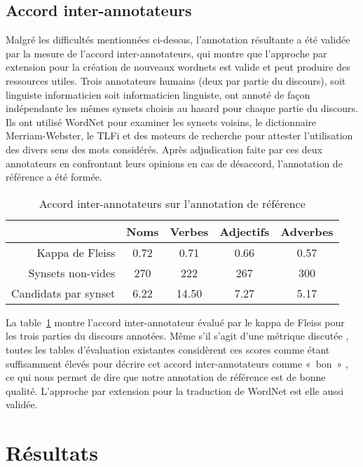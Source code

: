 \subsection{Accord inter-annotateurs}
\label{subsec:interannotator_agreement}

Malgré les difficultés mentionnées ci-dessus, l'annotation résultante a été
validée par la mesure de l'accord inter-annotateurs, qui montre que l'approche
par extension pour la création de nouveaux wordnets est valide et peut produire
des ressources utiles. Trois annotateurs humains (deux par partie du discours),
soit linguiste informaticien soit informaticien linguiste, ont annoté de façon
indépendante les mêmes synsets choisis au hasard pour chaque partie du
discours. Ils ont utilisé WordNet pour examiner les synsets voisins, le
dictionnaire Merriam-Webster, le TLFi \citep{TLFi} et des moteurs de recherche
pour attester l'utilisation des divers sens des mots considérés. Après
adjudication faite par ces deux annotateurs en confrontant leurs opinions en
cas de désaccord, l'annotation de référence a été formée.

\begin{table}[ht]
\centering
\begin{tabular}{rcccc}
  \toprule
                        & Noms    & Verbes  & Adjectifs & Adverbes\\
  \midrule
  Kappa de Fleiss       & 0.72    & 0.71    & 0.66      & 0.57 \\
  Synsets non-vides     & 270     & 222     & 267       & 300  \\
  Candidats par synset  & 6.22    & 14.50   & 7.27      & 5.17 \\
  \bottomrule
\end{tabular}
\caption{\label{table:kappa}Accord inter-annotateurs sur l'annotation de référence}
\end{table}

La table~\ref{table:kappa} montre l'accord inter-annotateur évalué par le kappa
de Fleiss pour les trois parties du discours annotées. Même s'il s'agit d'une
métrique discutée \citep{powers2012problem}, toutes les tables d'évaluation
existantes considèrent ces scores comme étant suffisamment élevés pour décrire
cet accord inter-annotateurs comme «~bon~» \citep{gwet2001handbook}, ce qui
nous permet de dire que notre annotation de référence est de bonne qualité.
L'approche par extension pour la traduction de WordNet est elle aussi validée.

\section{Résultats}
\label{sec:results}

